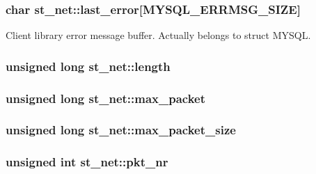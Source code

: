 \subsubsection[{last\+\_\+error}]{\setlength{\rightskip}{0pt plus 5cm}char st\+\_\+net\+::last\+\_\+error\mbox{[}{\bf M\+Y\+S\+Q\+L\+\_\+\+E\+R\+R\+M\+S\+G\+\_\+\+S\+I\+Z\+E}\mbox{]}}\label{structst__net_a076ac7884d3874905c0c95b6518228fc}
Client library error message buffer. Actually belongs to struct M\+Y\+S\+Q\+L. \hypertarget{structst__net_a5b8619539c5be9ee32051f3e063d428e}{}
\subsubsection[{length}]{\setlength{\rightskip}{0pt plus 5cm}unsigned long st\+\_\+net\+::length}\label{structst__net_a5b8619539c5be9ee32051f3e063d428e}
\hypertarget{structst__net_aa992b03f110362b7281ad288326d29e8}{}
\subsubsection[{max\+\_\+packet}]{\setlength{\rightskip}{0pt plus 5cm}unsigned long st\+\_\+net\+::max\+\_\+packet}\label{structst__net_aa992b03f110362b7281ad288326d29e8}
\hypertarget{structst__net_a519fa13bc0447d4058c9f32b9b34a08a}{}
\subsubsection[{max\+\_\+packet\+\_\+size}]{\setlength{\rightskip}{0pt plus 5cm}unsigned long st\+\_\+net\+::max\+\_\+packet\+\_\+size}\label{structst__net_a519fa13bc0447d4058c9f32b9b34a08a}
\hypertarget{structst__net_aee20cf636fc25c58b9da8c9aeabc33a9}{}
\subsubsection[{pkt\+\_\+nr}]{\setlength{\rightskip}{0pt plus 5cm}unsigned int st\+\_\+net\+::pkt\+\_\+nr}\label{structst__net_aee20cf636fc25c58b9da8c9aeabc33a9}
\hypertarget{structst__net_af65adc7b04ff56e008c6f8ca89cc12c2}{}
